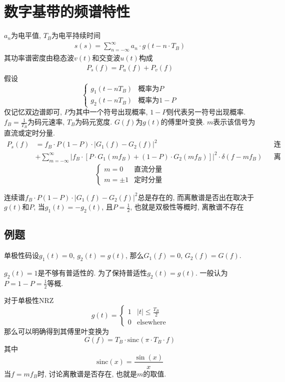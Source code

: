 \documentclass[a4paper]{report}
\begin{document}
\section{数字基带的频谱特性}
$a_n$为电平值, $T_B$为电平持续时间
\begin{align*}
  s(s)=\displaystyle\sum_{n=-\infty}^{\infty}a_n\cdot g(t-n\cdot T_B)
\end{align*}
其功率谱密度由稳态波$v(t)$和交变波$u(t)$构成
\begin{align*}
  P_s(f)=P_u(f)+P_v(f)
\end{align*}
假设
\begin{equation}
  \begin{cases}
    g_1(t-nT_B)&\text{概率为}P
    \\ g_2(t-nT_B)&\text{概率为}1-P
  \end{cases}
\end{equation}
仅记忆双边谱即可, $P$为其中一个符号出现概率, $1-P$则代表另一符号出现概率. $f_B=\frac{1}{T_B}$为码元速率, $T_B$为码元宽度. $G(f)$为$g(t)$的傅里叶变换. $m$表示该信号为直流或定时分量. 
\begin{align*}
  P_s(f)&=f_B\cdot P(1-P)\cdot\lvert G_1(f)-G_2(f)\rvert^2 &&\text{连续谱}
  \\ &+\displaystyle\sum_{m=-\infty}^{\infty}\lvert f_B\cdot [P\cdot G_1(mf_B)+(1-P)\cdot G_2(mf_B)]\rvert^2\cdot \delta(f-mf_B) &&\text{离散谱}
\end{align*}
\begin{equation}
  \begin{cases}
    m=0 &\text{直流分量}
    \\ m=\pm 1 &\text{定时分量}
  \end{cases}
\end{equation}

连续谱$f_B\cdot P(1-P)\cdot\lvert G_1(f)-G_2(f)\rvert^2$总是存在的, 而离散谱是否出在取决于$g(t)$和$P$, 当$g_1(t)=-g_2(t)$, 且$P=\frac{1}{2}$, 也就是双极性等概时, 离散谱不存在

\subsection{例题}
单极性码设$g_1(t)=0$, $g_2(t)=g(t)$, 那么$G_1(f)=0$, $G_2(f)=G(f)$. 

$g_2(t)=1$是不够有普适性的. 为了保持普适性$g_2(t)=g(t)$. 一般认为$P=1-P=\frac{1}{2}$等概. 

对于单极性NRZ
\begin{equation}
  g(t)=\begin{cases}
    1&\lvert t \rvert \leq \frac{T_B}{2}
    \\ 0 &\text{elsewhere}
  \end{cases}
\end{equation}
那么可以明确得到其傅里叶变换为
\begin{equation}
  G(f)=T_B\cdot \text{sinc}(\pi\cdot T_B \cdot f)
\end{equation}
其中
\begin{equation}
  \text{sinc}(x)=\frac{\sin{(x)}}{x}
\end{equation}
当$f=mf_B$时, 讨论离散谱是否存在, 也就是$m$的取值. 
\end{document}
